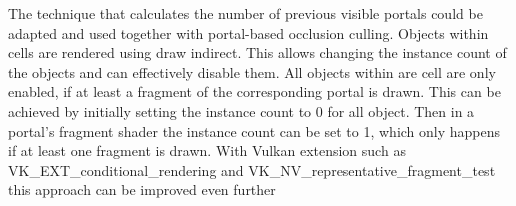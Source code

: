 The technique that calculates the number of previous visible portals could be adapted and used together with portal-based occlusion culling. Objects within cells are rendered using draw indirect. This allows changing the instance count of the objects and can effectively disable them. All objects within are cell are only enabled, if at least a fragment of the corresponding portal is drawn. This can be achieved by initially setting the instance count to 0 for all object. Then in a portal's fragment shader the instance count can be set to 1, which only happens if at least one fragment is drawn. With Vulkan extension such as VK\_EXT\_conditional\_rendering and VK\_NV\_representative\_fragment\_test this approach can be improved even further \cite{khronos:vulkan:spec1.1}






